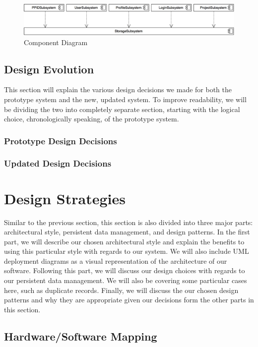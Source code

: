 \documentclass[12pt,letterpaper]{article}
\begin{document}
\begin{figure}[H]
	\centering{}
	\includegraphics[scale=0.27]{imgs/d3/decomp/component-diagram.png}
	\caption{Component Diagram}
\end{figure}

\subsection{Design Evolution}

This section will explain the various design decisions we made for both the prototype system and the new, updated system. To improve readability, we will be dividing the two into completely separate section, starting with the logical choice, chronologically speaking, of the prototype system.

\subsubsection{Prototype Design Decisions}
\subsubsection{Updated Design Decisions}
\section{Design Strategies}

Similar to the previous section, this section is also divided into three major parts: architectural style, persistent data management, and design patterns. In the first part, we will describe our chosen architectural style and explain the benefits to using this particular style with regards to our system. We will also include UML deployment diagrams as a visual representation of the architecture of our software. Following this part, we will discuss our design choices with regards to our persistent data management. We will also be covering some particular cases here, such as duplicate records. Finally, we will discuss the our chosen design patterns and why they are appropriate given our decisions form the other parts in this section.

\subsection{Hardware/Software Mapping}
\end{document}
